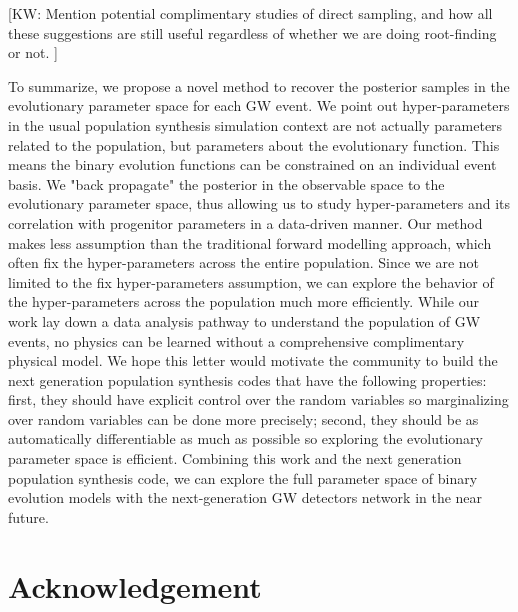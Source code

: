 \documentclass[twocolumn]{aastex631}
\newcommand{\kw}[1]{{\color{rb4}[KW: #1 ]}}
\begin{document}
\kw{Mention potential complimentary studies of direct sampling, and how all these suggestions are still useful regardless of whether we are doing root-finding or not.}

To summarize, we propose a novel method to recover the posterior samples in the evolutionary parameter space for each GW event.
We point out hyper-parameters in the usual population synthesis simulation context are not actually parameters related to the population,
but parameters about the evolutionary function.
This means the binary evolution functions can be constrained on an individual event basis.
We "back propagate" the posterior in the observable space to the evolutionary parameter space,
thus allowing us to study hyper-parameters and its correlation with progenitor parameters in a data-driven manner.
Our method makes less assumption than the traditional forward modelling approach,
which often fix the hyper-parameters across the entire population.
Since we are not limited to the fix hyper-parameters assumption, we can explore the behavior of the hyper-parameters across the population much more efficiently.
While our work lay down a data analysis pathway to understand the population of GW events,
no physics can be learned without a comprehensive complimentary physical model.
We hope this letter would motivate the community to build the next generation population synthesis codes that have the following properties:
first, they should have explicit control over the random variables so marginalizing over random variables can be done more precisely;
second, they should be as automatically differentiable as much as possible so exploring the evolutionary parameter space is efficient.
Combining this work and the next generation population synthesis code,
we can explore the full parameter space of binary evolution models with the next-generation GW detectors network in the near future.





\section{Acknowledgement}


\end{document}
